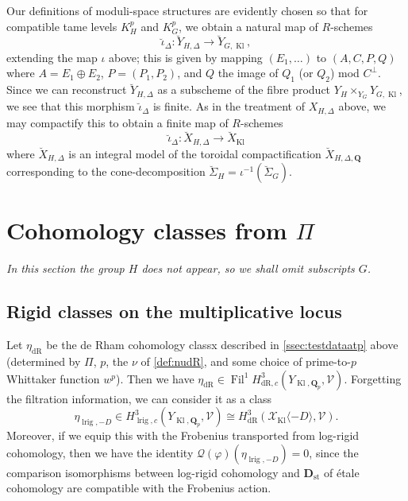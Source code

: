 \documentclass[cjm]{ipart}
\theoremstyle{plain}
\theoremstyle{remark}
\DeclareMathOperator{\Fil}{Fil}
\DeclareMathOperator{\Kl}{Kl}
\DeclareMathOperator{\lrig}{lrig}
\DeclareMathOperator{\st}{st}
\newcommand{\QQ}{\mathbf{Q}}
\newcommand{\Qp}{\QQ_p}
\newcommand{\cQ}{\mathcal{Q}}
\newcommand{\cV}{\mathcal{V}}
\newcommand{\cX}{\mathcal{X}}
\newcommand{\dR}{\mathrm{dR}}
\numberwithin{equation}{subsection}
\begin{document}
  Our definitions of moduli-space structures are evidently chosen so that for compatible tame levels $K^p_H$ and $K^p_G$, we obtain a natural map of $R$-schemes
  \[ \breve{\iota}_{\Delta}: \breve{Y}_{H, \Delta} \to \breve{Y}_{G, \Kl}, \]
  extending the map $\iota$ above; this is given by mapping $(E_1, \dots)$ to $(A, C, P, Q)$ where $A = E_1 \oplus E_2$, $P = (P_1, P_2)$, and $Q$ the image of $Q_1$ (or $Q_2$) mod $C^\perp$. Since we can reconstruct $\breve{Y}_{H, \Delta}$ as a subscheme of the fibre product $Y_H \times_{Y_G} Y_{G, \Kl}$, we see that this morphism $\breve{\iota}_{\Delta}$ is finite. As in the treatment of $X_{H, \Delta}$ above, we may compactify this to obtain a finite map of $R$-schemes
  \[ \breve\iota_{\Delta}: \breve{X}_{H, \Delta} \to \breve{X}_{ \Kl} \]
  where $\breve{X}_{H, \Delta}$ is an integral model of the toroidal compactification $\breve{X}_{H, \Delta, \QQ}$ corresponding to the cone-decomposition $\breve{\Sigma}_H = \iota^{-1}\left(\breve{\Sigma}_G\right)$.


\section{Cohomology classes from \texorpdfstring{$\Pi$}{Pi}}
 \emph{In this section the group $H$ does not appear, so we shall omit subscripts $G$.}

 \subsection{Rigid classes on the multiplicative locus}
  \label{sect:rigidfromPi}

  Let $\eta_{\dR}$ be the de Rham cohomology classx described in \cref{ssec:testdataatp} above (determined by $\Pi$, $p$, the $\nu$ of \cref{def:nudR}, and some choice of prime-to-$p$ Whittaker function $w^p$). Then we have $\eta_{\dR} \in \Fil^1 H^3_{\dR,c}(Y_{ \Kl, \Qp}, \cV)$. Forgetting the filtration information, we can consider it as a class
  \[
   \eta_{\lrig,-D} \in H^3_{\lrig,c}(Y_{\Kl, \Qp}, \cV) \cong H^3_{\dR}\left( \cX_{\Kl}\langle -D \rangle, \cV\right).
  \]
  Moreover, if we equip this with the Frobenius transported from log-rigid cohomology, then we have the identity $\cQ(\varphi)(\eta_{\lrig,-D}) = 0$, since the comparison isomorphisms between log-rigid cohomology and $\mathbf{D}_{\st}$ of \'etale cohomology are compatible with the Frobenius action.
\end{document}
